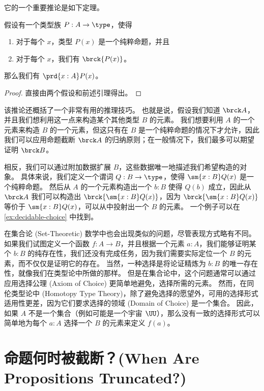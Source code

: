 它的一个重要推论是如下定理。

\begin{cor}\label{cor:UC}
假设有一个类型族 $P:A\to \type$，使得
\begin{enumerate}
  \item 对于每个 $x$，类型 $P(x)$ 是一个纯粹命题，并且
  \item 对于每个 $x$，我们有 $\brck {P(x)}$。
\end{enumerate}
那么我们有 $\prd{x:A} P(x)$。
\end{cor}
\begin{proof}
  直接由两个假设和前述引理得出。
\end{proof}

该推论还概括了一个非常有用的推理技巧。
也就是说，假设我们知道 $\brck A$，并且我们想利用这一点来构造某个其他类型 $B$ 的元素。
我们想要利用 $A$ 的一个元素来构造 $B$ 的一个元素，但这只有在 $B$ 是一个纯粹命题的情况下才允许，因此我们可以应用命题截断 $\brck A$ 的归纳原则；在一般情况下，我们最多可以期望证明 $\brck B$。

相反，我们可以通过附加数据扩展 $B$，这些数据唯一地描述我们希望构造的对象。
具体来说，我们定义一个谓词 $Q:B\to\type$，使得 $\sm{x:B} Q(x)$ 是一个纯粹命题。
然后从 $A$ 的一个元素构造出一个 $b:B$ 使得 $Q(b)$ 成立，因此从 $\brck A$ 我们可以构造出 $\brck{\sm{x:B} Q(x)}$，因为 $\brck{\sm{x:B} Q(x)}$ 等价于 $\sm{x:B} Q(x)$，可以从中投射出一个 $B$ 的元素。
一个例子可以在 \cref{ex:decidable-choice} 中找到。

在集合论 (Set-Theoretic) 数学中也会出现类似的问题，尽管表现方式略有不同。
如果我们试图定义一个函数 $f: A \to B$，并且根据一个元素 $a : A$，我们能够证明某个 $b : B$ 的纯存在性，我们还没有完成任务，因为我们需要实际定位一个 $B$ 的元素，而不仅仅是证明它的存在。
当然，一种选择是将论证精炼为 $b : B$ 的唯一存在性，就像我们在类型论中所做的那样。
但是在集合论中，这个问题通常可以通过应用选择公理 (Axiom of Choice) 更简单地避免，选择所需的元素。
然而，在同伦类型论中 (Homotopy Type Theory)，除了避免选择的愿望外，可用的选择形式适用性更差，因为它们要求选择的领域 (Domain of Choice) 是一个集合。
因此，如果 $A$ 不是一个集合（例如可能是一个宇宙 $\UU$），那么没有一致的选择形式可以简单地为每个 $a : A$ 选择一个 $B$ 的元素来定义 $f(a)$。

%


\section{命题何时被截断？(When Are Propositions Truncated?)}
\label{subsec:when-trunc}

